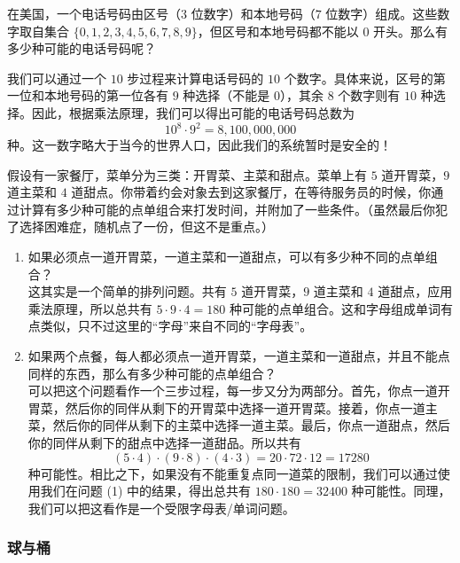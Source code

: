 \begin{example}
    在美国，一个电话号码由区号（$3$ 位数字）和本地号码（$7$ 位数字）组成。这些数字取自集合 $\{0, 1, 2, 3, 4, 5, 6, 7, 8, 9\}$，但区号和本地号码都不能以 $0$ 开头。那么有多少种可能的电话号码呢？

    我们可以通过一个 $10$ 步过程来计算电话号码的 $10$ 个数字。具体来说，区号的第一位和本地号码的第一位各有 $9$ 种选择（不能是 $0$），其余 $8$ 个数字则有 $10$ 种选择。因此，根据乘法原理，我们可以得出可能的电话号码总数为
    \[10^8 \cdot 9^2 = 8,100,000,000\]
    种。这一数字略大于当今的世界人口，因此我们的系统暂时是安全的！
\end{example}

\begin{example}
    假设有一家餐厅，菜单分为三类：开胃菜、主菜和甜点。菜单上有 $5$ 道开胃菜，$9$ 道主菜和 $4$ 道甜点。你带着约会对象去到这家餐厅，在等待服务员的时候，你通过计算有多少种可能的点单组合来打发时间，并附加了一些条件。（虽然最后你犯了选择困难症，随机点了一份，但这不是重点。）
    \begin{enumerate}[label=(\arabic*)]
        \item 如果必须点一道开胃菜，一道主菜和一道甜点，可以有多少种不同的点单组合？\\
              这其实是一个简单的排列问题。共有 $5$ 道开胃菜，$9$ 道主菜和 $4$ 道甜点，应用乘法原理，所以总共有 $5 \cdot 9 \cdot 4 = 180$ 种可能的点单组合。这和字母组成单词有点类似，只不过这里的``字母''来自不同的``字母表''。
        \item 如果两个点餐，每人都必须点一道开胃菜，一道主菜和一道甜点，并且不能点同样的东西，那么有多少种可能的点单组合？\\
              可以把这个问题看作一个三步过程，每一步又分为两部分。首先，你点一道开胃菜，然后你的同伴从剩下的开胃菜中选择一道开胃菜。接着，你点一道主菜，然后你的同伴从剩下的主菜中选择一道主菜。最后，你点一道甜点，然后你的同伴从剩下的甜点中选择一道甜品。所以共有
              \[(5 \cdot 4) \cdot (9 \cdot 8) \cdot (4 \cdot 3) = 20 \cdot 72 \cdot 12 = 17280\]
              种可能性。相比之下，如果没有不能重复点同一道菜的限制，我们可以通过使用我们在问题 (1) 中的结果，得出总共有 $180 \cdot 180 = 32400$ 种可能性。同理，我们可以把这看作是一个受限字母表/单词问题。
    \end{enumerate}

\end{example}

\subsubsection*{球与桶}

